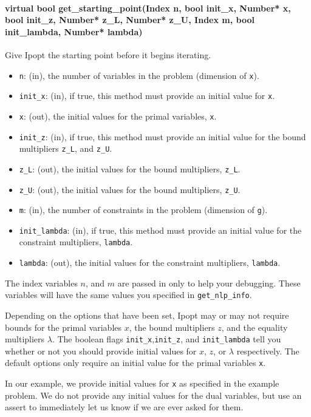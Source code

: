 \documentclass[letter,10pt]{article}
\begin{document}
{\paragraph{virtual bool get\_starting\_point(Index n, bool init\_x, Number* x, \\
              bool init\_z, Number* z\_L, Number* z\_U, Index m, 
        bool init\_lambda, Number* lambda)} 
$\;$ \\
Give Ipopt the starting point before it begins iterating.
\begin{itemize}
\item {\tt n}: (in), the number of variables in the problem (dimension of {\tt x}). 
\item {\tt init\_x}: (in), if true, this method must provide an initial value for {\tt x}.
\item {\tt x}: (out), the initial values for the primal variables, {\tt x}.
\item {\tt init\_z}: (in), if true, this method must provide an initial value 
        for the bound multipliers {\tt z\_L}, and {\tt z\_U}.
\item {\tt z\_L}: (out), the initial values for the bound multipliers, {\tt z\_L}.
\item {\tt z\_U}: (out), the initial values for the bound multipliers, {\tt z\_U}.
\item {\tt m}: (in), the number of constraints in the problem (dimension of {\tt g}).
\item {\tt init\_lambda}: (in), if true, this method must provide an initial value 
        for the constraint multipliers, {\tt lambda}.
\item {\tt lambda}: (out), the initial values for the constraint multipliers, {\tt lambda}.
\end{itemize}

The index variables $n$, and $m$ are passed in only to help your
debugging. These variables will have the same values you specified in
{\tt get\_nlp\_info}.

Depending on the options that have been set,
Ipopt may or may not require bounds for the primal variables $x$, the
bound multipliers $z$, and the equality multipliers $\lambda$. The
boolean flags {\tt init\_x},{\tt init\_z}, and {\tt init\_lambda} tell
you whether or not you should provide initial values for $x$, $z$, or
$\lambda$ respectively. The default options only require an
initial value for the primal variables {\tt x}.

In our example, we provide initial values for {\tt x} as specified in the example
problem. We do not provide any initial values for the dual variables,
but use an assert to immediately let us know if we are ever asked for
them.

}
\end{document}
